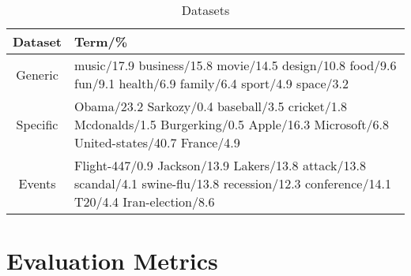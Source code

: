 \documentclass{sig-alternate}
\begin{document}
\begin{table}%
\centering
\caption{Datasets}\label{tbl-q}
\resizebox{8.5cm}{!} 
{
	\begin{tabular}{|c|p{4in}|}
	\hline
        Dataset & Term/\% \\
\hline
Generic &{\small music/17.9 business/15.8 movie/14.5 design/10.8
       food/9.6 fun/9.1 health/6.9 family/6.4 sport/4.9 space/3.2}  \\
Specific &{\small 
Obama/23.2 Sarkozy/0.4 baseball/3.5 cricket/1.8 Mcdonalds/1.5 Burgerking/0.5 Apple/16.3 Microsoft/6.8 United-states/40.7 France/4.9} \\
Events &{\small Flight-447/0.9 Jackson/13.9  Lakers/13.8 attack/13.8 scandal/4.1 swine-flu/13.8 recession/12.3 conference/14.1 T20/4.4 Iran-election/8.6  }\\
	\hline
	\end{tabular}
}\vspace*{-10pt}
\end{table}
 


\section{Evaluation Metrics}

\label{sec:evaluation}
\end{document}
